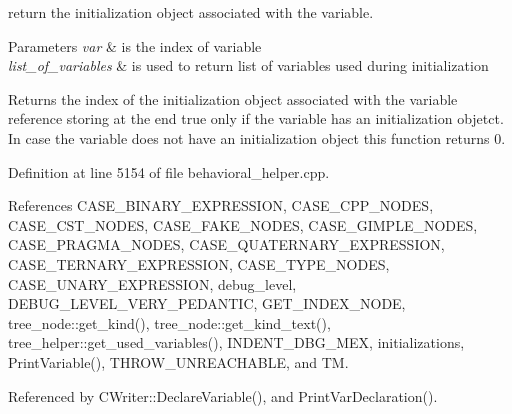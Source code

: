 return the initialization object associated with the variable. 


\begin{DoxyParams}{Parameters}
{\em var} & is the index of variable \\
\hline
{\em list\+\_\+of\+\_\+variables} & is used to return list of variables used during initialization \\
\hline
\end{DoxyParams}
\begin{DoxyReturn}{Returns}
the index of the initialization object associated with the variable reference storing at the end true only if the variable has an initialization objetct. In case the variable does not have an initialization object this function returns 0. 
\end{DoxyReturn}


Definition at line 5154 of file behavioral\+\_\+helper.\+cpp.



References C\+A\+S\+E\+\_\+\+B\+I\+N\+A\+R\+Y\+\_\+\+E\+X\+P\+R\+E\+S\+S\+I\+ON, C\+A\+S\+E\+\_\+\+C\+P\+P\+\_\+\+N\+O\+D\+ES, C\+A\+S\+E\+\_\+\+C\+S\+T\+\_\+\+N\+O\+D\+ES, C\+A\+S\+E\+\_\+\+F\+A\+K\+E\+\_\+\+N\+O\+D\+ES, C\+A\+S\+E\+\_\+\+G\+I\+M\+P\+L\+E\+\_\+\+N\+O\+D\+ES, C\+A\+S\+E\+\_\+\+P\+R\+A\+G\+M\+A\+\_\+\+N\+O\+D\+ES, C\+A\+S\+E\+\_\+\+Q\+U\+A\+T\+E\+R\+N\+A\+R\+Y\+\_\+\+E\+X\+P\+R\+E\+S\+S\+I\+ON, C\+A\+S\+E\+\_\+\+T\+E\+R\+N\+A\+R\+Y\+\_\+\+E\+X\+P\+R\+E\+S\+S\+I\+ON, C\+A\+S\+E\+\_\+\+T\+Y\+P\+E\+\_\+\+N\+O\+D\+ES, C\+A\+S\+E\+\_\+\+U\+N\+A\+R\+Y\+\_\+\+E\+X\+P\+R\+E\+S\+S\+I\+ON, debug\+\_\+level, D\+E\+B\+U\+G\+\_\+\+L\+E\+V\+E\+L\+\_\+\+V\+E\+R\+Y\+\_\+\+P\+E\+D\+A\+N\+T\+IC, G\+E\+T\+\_\+\+I\+N\+D\+E\+X\+\_\+\+N\+O\+DE, tree\+\_\+node\+::get\+\_\+kind(), tree\+\_\+node\+::get\+\_\+kind\+\_\+text(), tree\+\_\+helper\+::get\+\_\+used\+\_\+variables(), I\+N\+D\+E\+N\+T\+\_\+\+D\+B\+G\+\_\+\+M\+EX, initializations, Print\+Variable(), T\+H\+R\+O\+W\+\_\+\+U\+N\+R\+E\+A\+C\+H\+A\+B\+LE, and TM.



Referenced by C\+Writer\+::\+Declare\+Variable(), and Print\+Var\+Declaration().


